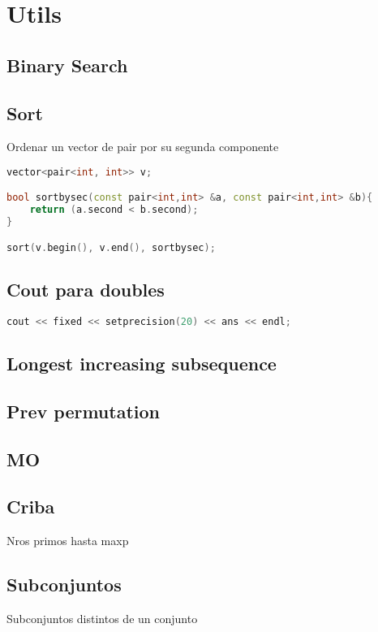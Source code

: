 \section{Utils}

\subsection{Binary Search}


\subsection{Sort}
Ordenar un vector de pair por su segunda componente
\begin{lstlisting}[language=C++]
vector<pair<int, int>> v;

bool sortbysec(const pair<int,int> &a, const pair<int,int> &b){
	return (a.second < b.second);
}

sort(v.begin(), v.end(), sortbysec);
\end{lstlisting}
\subsection{Cout para doubles}
\begin{lstlisting}[language=C++]
cout << fixed << setprecision(20) << ans << endl;
\end{lstlisting}
\subsection{Longest increasing subsequence}

\subsection{Prev permutation}

\subsection{MO}


\subsection{Criba}
Nros primos hasta maxp


\subsection{Subconjuntos}
Subconjuntos distintos de un conjunto


\newpage


